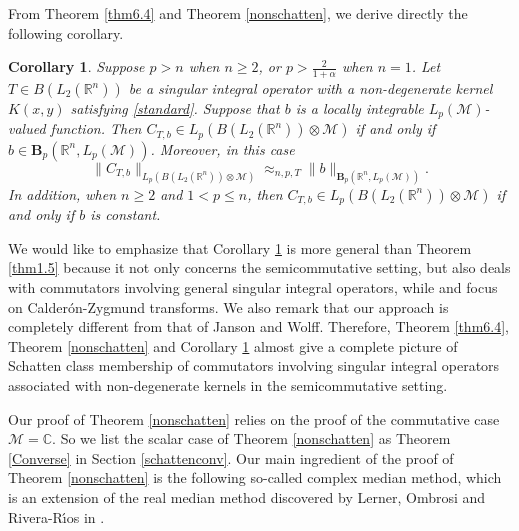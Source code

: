 \documentclass[oneside,english,a4wide]{amsart}
\numberwithin{equation}{section}
\numberwithin{figure}{section}
\theoremstyle{plain}
\theoremstyle{plain}
\newtheorem{corollary}[thm]{Corollary}
\theoremstyle{definition}
\theoremstyle{plain}
\theoremstyle{remark}
\theoremstyle{definition}
\theoremstyle{remark}
\theoremstyle{definition}
\newcommand{\M}{{\mathcal M}}
\newcommand{\8}{\infty}
\begin{document}
From Theorem \ref{thm6.4} and Theorem \ref{nonschatten}, we derive directly the following corollary.
	\begin{corollary}\label{corollary1.8}
		Suppose $p>n$ when $n\geq 2$, or $p>\frac{2}{1+\alpha}$ when $n=1$. Let $T\in B(L_2(\mathbb{R}^n))$ be a singular integral operator with a non-degenerate kernel $K(x,y)$ satisfying \eqref{standard}. Suppose that $b$ is a locally integrable $L_p(\mathcal{M})$-valued function. Then $ C_{T, b}\in L_p(B(L_2(\mathbb{R}^n))\otimes \mathcal{M})$ if and only if $b\in \pmb{B}_p(\mathbb{R}^n, L_p(\mathcal{M}))$. Moreover, in this case
		$$ \| C_{T, b}\|_{L_p(B(L_2(\mathbb{R}^n))\otimes \mathcal{M})}\approx_{n,p,T} 	\|b\|_{\pmb{B}_p(\mathbb{R}^n, L_p(\mathcal{M}))}.  $$
		In addition, when $n\geq 2$ and $1<p\leq n$, then $ C_{T, b}\in L_p(B(L_2(\mathbb{R}^n))\otimes \mathcal{M})$ if and only if $b$ is constant.
\end{corollary}

We would like to emphasize that Corollary \ref{corollary1.8} is more general than Theorem \ref{thm1.5} because it not only concerns the semicommutative setting, but also deals with commutators involving general singular integral operators, while \cite{JPe} and \cite{JW} focus on Calder\'{o}n-Zygmund transforms. We also remark that our approach is completely different from that of Janson and Wolff. Therefore, Theorem \ref{thm6.4}, Theorem \ref{nonschatten} and Corollary \ref{corollary1.8} almost give a complete picture of Schatten class membership of commutators involving singular integral operators associated with non-degenerate kernels in the semicommutative setting.

Our proof of Theorem \ref{nonschatten} relies on the proof of the commutative case $\M=\mathbb{C}$. So we list the scalar case of Theorem \ref{nonschatten} as Theorem \ref{Converse} in Section \ref{schattenconv}. Our main ingredient of the proof of Theorem \ref{nonschatten} is the following so-called complex median method, which is an extension of the real median method discovered by Lerner, Ombrosi and Rivera-R\'{\i}os in \cite{LOR}.
\end{document}
